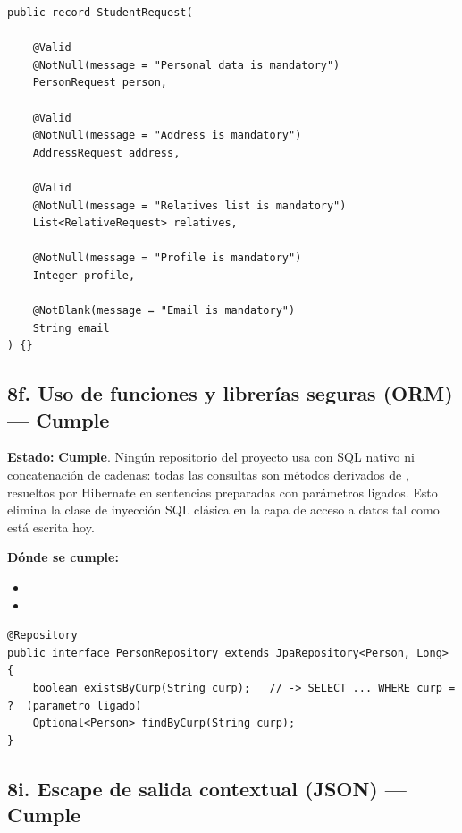 \documentclass[11pt,a4paper]{article}
\newcommand{\Cumple}{\textcolor{cumpleColor}{\textbf{Cumple}}}
\begin{document}
\begin{lstlisting}[style=javastyle,caption={Validación en cascada sobre estructuras JSON anidadas (StudentRequest.java)}]
public record StudentRequest(

    @Valid
    @NotNull(message = "Personal data is mandatory")
    PersonRequest person,

    @Valid
    @NotNull(message = "Address is mandatory")
    AddressRequest address,

    @Valid
    @NotNull(message = "Relatives list is mandatory")
    List<RelativeRequest> relatives,

    @NotNull(message = "Profile is mandatory")
    Integer profile,

    @NotBlank(message = "Email is mandatory")
    String email
) {}
\end{lstlisting}

\subsection{8f. Uso de funciones y librerías seguras (ORM) --- \Cumple}

\textbf{Estado:} \Cumple. Ningún repositorio del proyecto usa \texttt{} con SQL nativo ni concatenación de cadenas: todas las consultas son métodos derivados de \texttt{}, resueltos por Hibernate en sentencias preparadas con parámetros ligados. Esto elimina la clase de inyección SQL clásica en la capa de acceso a datos tal como está escrita hoy.

\textbf{Dónde se cumple:}
\begin{itemize}[leftmargin=1.2cm,nosep]
\item \texttt{}
\item \texttt{}
\end{itemize}

\begin{lstlisting}[style=javastyle,caption={Consultas 100 porciento parametrizadas vía Spring Data JPA (PersonRepository.java)}]
@Repository
public interface PersonRepository extends JpaRepository<Person, Long> {
    boolean existsByCurp(String curp);   // -> SELECT ... WHERE curp = ?  (parametro ligado)
    Optional<Person> findByCurp(String curp);
}
\end{lstlisting}

\subsection{8i. Escape de salida contextual (JSON) --- \Cumple}
\end{document}
